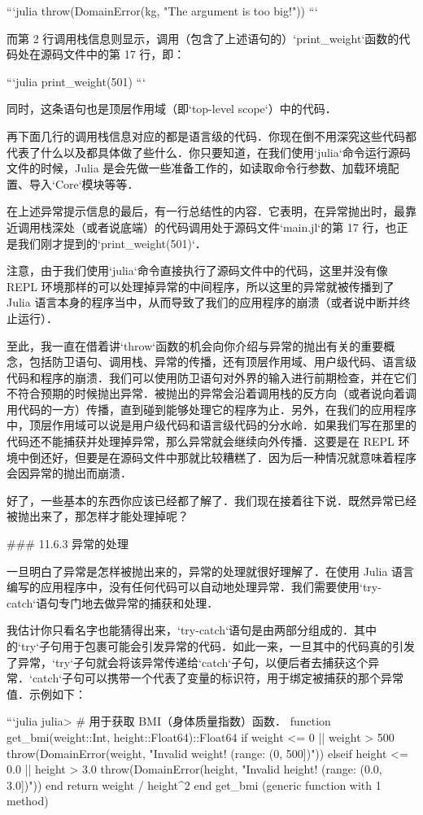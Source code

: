 ```julia
throw(DomainError(kg, "The argument is too big!"))
```

而第 2 行调用栈信息则显示，调用（包含了上述语句的）`print_weight`函数的代码处在源码文件中的第 17 行，即：

```julia
print_weight(501)
```

同时，这条语句也是顶层作用域（即`top-level scope`）中的代码．

再下面几行的调用栈信息对应的都是语言级的代码．你现在倒不用深究这些代码都代表了什么以及都具体做了些什么．你只要知道，在我们使用`julia`命令运行源码文件的时候，Julia 是会先做一些准备工作的，如读取命令行参数、加载环境配置、导入`Core`模块等等． 

在上述异常提示信息的最后，有一行总结性的内容．它表明，在异常抛出时，最靠近调用栈深处（或者说底端）的代码调用处于源码文件`main.jl`的第 17 行，也正是我们刚才提到的`print_weight(501)`．

注意，由于我们使用`julia`命令直接执行了源码文件中的代码，这里并没有像 REPL 环境那样的可以处理掉异常的中间程序，所以这里的异常就被传播到了 Julia 语言本身的程序当中，从而导致了我们的应用程序的崩溃（或者说中断并终止运行）．

至此，我一直在借着讲`throw`函数的机会向你介绍与异常的抛出有关的重要概念，包括防卫语句、调用栈、异常的传播，还有顶层作用域、用户级代码、语言级代码和程序的崩溃．我们可以使用防卫语句对外界的输入进行前期检查，并在它们不符合预期的时候抛出异常．被抛出的异常会沿着调用栈的反方向（或者说向着调用代码的一方）传播，直到碰到能够处理它的程序为止．另外，在我们的应用程序中，顶层作用域可以说是用户级代码和语言级代码的分水岭．如果我们写在那里的代码还不能捕获并处理掉异常，那么异常就会继续向外传播．这要是在 REPL 环境中倒还好，但要是在源码文件中那就比较糟糕了．因为后一种情况就意味着程序会因异常的抛出而崩溃．

好了，一些基本的东西你应该已经都了解了．我们现在接着往下说．既然异常已经被抛出来了，那怎样才能处理掉呢？

### 11.6.3 异常的处理

一旦明白了异常是怎样被抛出来的，异常的处理就很好理解了．在使用 Julia 语言编写的应用程序中，没有任何代码可以自动地处理异常．我们需要使用`try-catch`语句专门地去做异常的捕获和处理．

我估计你只看名字也能猜得出来，`try-catch`语句是由两部分组成的．其中的`try`子句用于包裹可能会引发异常的代码．如此一来，一旦其中的代码真的引发了异常，`try`子句就会将该异常传递给`catch`子句，以便后者去捕获这个异常．`catch`子句可以携带一个代表了变量的标识符，用于绑定被捕获的那个异常值．示例如下：

```julia
julia> # 用于获取 BMI（身体质量指数）函数．
       function get_bmi(weight::Int, height::Float64)::Float64
           if weight <= 0 || weight > 500
               throw(DomainError(weight, "Invalid weight! (range: (0, 500])"))
           elseif height <= 0.0 || height > 3.0
               throw(DomainError(height, "Invalid height! (range: (0.0, 3.0])"))
           end
           return weight / height^2
       end
get_bmi (generic function with 1 method)

